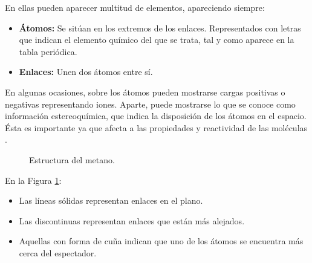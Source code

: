 \noindent En ellas pueden aparecer multitud de elementos, apareciendo siempre:
\begin{itemize}
    \item \textbf{Átomos:} Se sitúan en los extremos de los enlaces. Representados con letras que indican el elemento químico del que se trata, tal y como aparece en la tabla periódica.
    \item \textbf{Enlaces:} Unen dos átomos entre sí. 
\end{itemize}

En algunas ocasiones, sobre los átomos pueden mostrarse cargas positivas o negativas representando iones. Aparte, puede mostrarse lo que se conoce como información estereoquímica, que indica la disposición de los átomos en el espacio. Ésta es importante ya que afecta a las propiedades y reactividad de las moléculas \cite{estereoquimica,structrep}.

\begin{figure}[H]
\centering
    \caption{Estructura del metano. \cite{structrep}} 
    \label{fig:metano}
\end{figure}

En la Figura \ref{fig:metano}:
\begin{itemize}
    \item Las líneas sólidas representan enlaces en el plano.
    \item Las discontinuas representan enlaces que están más alejados.
    \item Aquellas con forma de cuña indican que uno de los átomos se encuentra más cerca del espectador. 
\end{itemize}

